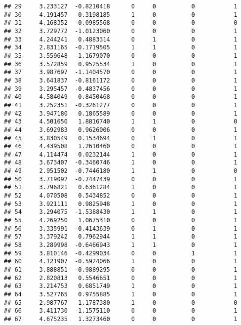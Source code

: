 \documentclass[
]{article}
\begin{document}
\begin{verbatim}
## 29     3.233127  -0.8210418      0     0          0           1
## 30     4.191457   0.3198185      1     0          0           1
## 31     4.168352  -0.0985568      0     0          0           0
## 32     3.729772  -1.0123060      0     0          0           1
## 33     4.244241   0.4883314      0     1          0           1
## 34     2.831165  -0.1719505      1     1          0           1
## 35     3.559648  -1.1679070      0     0          0           1
## 36     3.572859   0.9525534      1     0          0           1
## 37     3.987697  -1.1404570      0     0          0           1
## 38     3.641837  -0.8161172      0     0          0           1
## 39     3.295457  -0.4837456      0     0          0           1
## 40     4.584049   0.8450468      0     0          0           1
## 41     3.252351  -0.3261277      0     0          0           1
## 42     3.947180   0.1865589      0     0          0           1
## 43     4.501650   1.8816740      1     1          0           0
## 44     3.692983   0.9626006      0     0          0           1
## 45     3.830549   0.1534694      0     1          0           1
## 46     4.439508   1.2610460      0     0          0           1
## 47     4.114474   0.0232144      1     0          0           1
## 48     3.673407  -0.3460746      1     0          0           1
## 49     2.951502  -0.7446180      1     1          0           0
## 50     3.719092  -0.7447439      0     0          0           1
## 51     3.796821   0.6361284      1     0          0           1
## 52     4.070508   0.5434852      0     0          0           1
## 53     3.921111   0.9825948      1     0          0           1
## 54     3.294075  -1.5388430      1     1          0           1
## 55     4.269250   1.0675310      0     0          0           1
## 56     3.335991  -0.4143639      0     1          0           1
## 57     3.379242   0.7962944      1     1          0           1
## 58     3.289998  -0.6466943      1     1          0           1
## 59     3.810146  -0.4299034      0     0          1           1
## 60     4.121907  -0.5924066      1     0          0           1
## 61     3.888851  -0.9889295      0     0          0           1
## 62     2.820813   0.5546651      0     0          0           1
## 63     3.214753   0.6851749      1     0          0           1
## 64     3.527765   0.9755885      1     0          0           1
## 65     2.987767  -1.1787380      1     0          0           0
## 66     3.411730  -1.1575110      0     0          0           1
## 67     4.675235   1.3273460      0     0          0           1

\end{verbatim}
\end{document}
